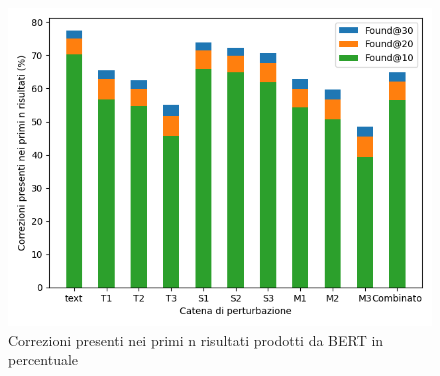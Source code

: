 \documentclass[12pt]{article}
\begin{document}
\begin{figure}[H]
\centering
\includegraphics[width=.9\textwidth]{distributions/overview.png}
\caption{Correzioni presenti nei primi n risultati prodotti da BERT in percentuale}
\label{fig:foundN}
\end{figure}







\end{document}
